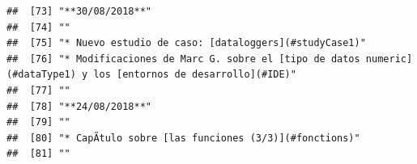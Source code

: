 \documentclass[
]{book}
\begin{document}
\begin{verbatim}
##  [73] "**30/08/2018**"                                                                                                                                                                                                                                                                                          
##  [74] ""                                                                                                                                                                                                                                                                                                        
##  [75] "* Nuevo estudio de caso: [dataloggers](#studyCase1)"                                                                                                                                                                                                                                                     
##  [76] "* Modificaciones de Marc G. sobre el [tipo de datos numeric](#dataType1) y los [entornos de desarrollo](#IDE)"                                                                                                                                                                                           
##  [77] ""                                                                                                                                                                                                                                                                                                        
##  [78] "**24/08/2018**"                                                                                                                                                                                                                                                                                          
##  [79] ""                                                                                                                                                                                                                                                                                                        
##  [80] "* CapÃ­tulo sobre [las funciones (3/3)](#fonctions)"                                                                                                                                                                                                                                                     
##  [81] ""                                                                                                                                                                                                                                                                                                        

\end{verbatim}
\end{document}

